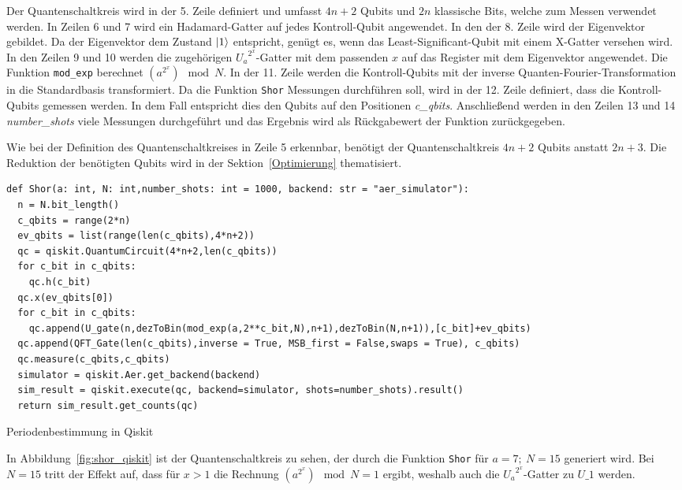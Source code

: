 Der Quantenschaltkreis wird in der 5. Zeile definiert und umfasst \(4n+2\) Qubits und 
\(2n\) klassische Bits, welche zum Messen verwendet werden.
In Zeilen 6 und 7 wird ein Hadamard-Gatter auf jedes Kontroll-Qubit angewendet.
In den der 8. Zeile wird der Eigenvektor gebildet. 
Da der Eigenvektor dem Zustand \(\ket{1}\) entspricht,
genügt es, wenn das Least-Significant-Qubit mit einem X-Gatter versehen wird.
In den Zeilen 9 und 10 werden die zugehörigen \({U_a}^{2^x}\)-Gatter mit dem passenden \(x\) auf das Register mit dem Eigenvektor angewendet.
Die Funktion \texttt{mod\_exp} berechnet \((a^{2^x})\mod N\).
In der 11. Zeile werden die Kontroll-Qubits mit der inverse Quanten-Fourier-Transformation in die Standardbasis transformiert.  
Da die Funktion \texttt{Shor} Messungen durchführen soll, 
wird in der 12. Zeile definiert, dass die Kontroll-Qubits gemessen werden.
In dem Fall entspricht dies den Qubits auf den Positionen \textit{c\_qbits}.
Anschließend werden in den Zeilen 13 und 14 \textit{number\_shots} viele Messungen durchgeführt und 
das Ergebnis wird als Rückgabewert der Funktion zurückgegeben.

Wie bei der Definition des Quantenschaltkreises in Zeile 5 erkennbar, 
benötigt der Quantenschaltkreis \(4n+2\) Qubits anstatt \(2n+3\).
Die Reduktion der benötigten Qubits wird in der Sektion~\ref{Optimierung} thematisiert. 

\begin{listing}[H]
\begin{verbatim}  
def Shor(a: int, N: int,number_shots: int = 1000, backend: str = "aer_simulator"):
  n = N.bit_length()
  c_qbits = range(2*n)
  ev_qbits = list(range(len(c_qbits),4*n+2))
  qc = qiskit.QuantumCircuit(4*n+2,len(c_qbits)) 
  for c_bit in c_qbits:
    qc.h(c_bit)
  qc.x(ev_qbits[0])
  for c_bit in c_qbits:
    qc.append(U_gate(n,dezToBin(mod_exp(a,2**c_bit,N),n+1),dezToBin(N,n+1)),[c_bit]+ev_qbits)
  qc.append(QFT_Gate(len(c_qbits),inverse = True, MSB_first = False,swaps = True), c_qbits)
  qc.measure(c_qbits,c_qbits)
  simulator = qiskit.Aer.get_backend(backend)
  sim_result = qiskit.execute(qc, backend=simulator, shots=number_shots).result()
  return sim_result.get_counts(qc)
  \end{verbatim}
  \caption{Periodenbestimmung in Qiskit}
  \label{code:Periodenbestimmung}
\end{listing}

In Abbildung~\ref{fig:shor_qiskit} ist der Quantenschaltkreis zu sehen, 
der durch die Funktion \texttt{Shor} für \(a=7;~N=15\) generiert wird.
Bei \(N=15\) tritt der Effekt auf, dass für \(x>1\) die Rechnung \((a^{2^x})\mod N = 1\) ergibt, 
weshalb auch die \({U_a}^{2^x}\)-Gatter zu \(U\_1\) werden.

